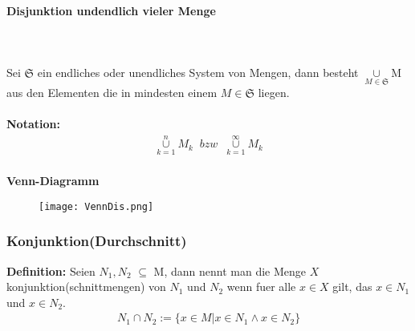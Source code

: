 \documentclass[../AbiMappe_Mathe.tex]{subfiles}
\begin{document}
\paragraph{Disjunktion undendlich vieler Menge}
		\hspace{0 cm} \\ \noindent \\
		Sei $\mathfrak{S}$ ein endliches oder unendliches System von Mengen, dann besteht $\underset{M \in \mathfrak{S}}{\cup}$M aus den Elementen die in mindesten einem $M \in  \mathfrak{S}$ liegen.\\\\
\textbf{Notation:}\\
\begin{align*}
\underset{k=1}{\overset{n}{\cup}}M_k \;\;bzw\;\; \underset{k=1}{\overset{\infty}{\cup}}M_k
\end{align*}\\
\textbf{Venn-Diagramm}
\begin{figure}[H]
\centering
\texttt{[image: VennDis.png]}
\end{figure}
\subsubsection{Konjunktion(Durchschnitt)}
\textbf{Definition:} Seien $N_1,N_2$ $\subseteq$ M, dann nennt man die Menge $X$ konjunktion(schnittmengen) von $N_1$ und  $N_2$ wenn fuer alle $x \in X$ gilt, das $x \in N_1$ und $x \in N_2$.
\begin{align*}
N_1 \cap N_2:=\{x \in M| x \in N_1 \land x \in N_2 \}
\end{align*}\\
\end{document}
